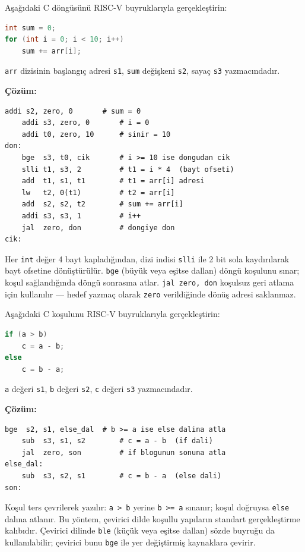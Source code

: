 \begin{ornek}[C.2]
\label{orn:ekc-dongu}
Aşağıdaki C döngüsünü RISC-V buyruklarıyla gerçekleştirin:
\begin{lstlisting}[language=C]
int sum = 0;
for (int i = 0; i < 10; i++)
    sum += arr[i];
\end{lstlisting}
\texttt{arr} dizisinin başlangıç adresi \texttt{s1}, \texttt{sum} değişkeni \texttt{s2}, sayaç \texttt{s3} yazmacındadır.

\textbf{Çözüm:}
\begin{lstlisting}[style=riscv]
    addi s2, zero, 0       # sum = 0
    addi s3, zero, 0       # i = 0
    addi t0, zero, 10      # sinir = 10
don:
    bge  s3, t0, cik       # i >= 10 ise dongudan cik
    slli t1, s3, 2         # t1 = i * 4  (bayt ofseti)
    add  t1, s1, t1        # t1 = arr[i] adresi
    lw   t2, 0(t1)         # t2 = arr[i]
    add  s2, s2, t2        # sum += arr[i]
    addi s3, s3, 1         # i++
    jal  zero, don         # dongiye don
cik:
\end{lstlisting}

Her \texttt{int} değer 4 bayt kapladığından, dizi indisi \texttt{slli} ile 2 bit sola kaydırılarak bayt ofsetine dönüştürülür. \texttt{bge} (büyük veya eşitse dallan) döngü koşulunu sınar; koşul sağlandığında döngü sonrasına atlar. \texttt{jal zero, don} koşulsuz geri atlama için kullanılır --- hedef yazmaç olarak \texttt{zero} verildiğinde dönüş adresi saklanmaz.
\end{ornek}

\begin{ornek}[C.3]
\label{orn:ekc-kosul}
Aşağıdaki C koşulunu RISC-V buyruklarıyla gerçekleştirin:
\begin{lstlisting}[language=C]
if (a > b)
    c = a - b;
else
    c = b - a;
\end{lstlisting}
\texttt{a} değeri \texttt{s1}, \texttt{b} değeri \texttt{s2}, \texttt{c} değeri \texttt{s3} yazmacındadır.

\textbf{Çözüm:}
\begin{lstlisting}[style=riscv]
    bge  s2, s1, else_dal  # b >= a ise else dalina atla
    sub  s3, s1, s2        # c = a - b  (if dali)
    jal  zero, son         # if blogunun sonuna atla
else_dal:
    sub  s3, s2, s1        # c = b - a  (else dali)
son:
\end{lstlisting}

Koşul ters çevrilerek yazılır: \texttt{a > b} yerine \texttt{b >= a} sınanır; koşul doğruysa \texttt{else} dalına atlanır. Bu yöntem, çevirici dilde koşullu yapıların standart gerçekleştirme kalıbıdır. Çevirici dilinde \texttt{ble} (küçük veya eşitse dallan) sözde buyruğu da kullanılabilir; çevirici bunu \texttt{bge} ile yer değiştirmiş kaynaklara çevirir.
\end{ornek}

